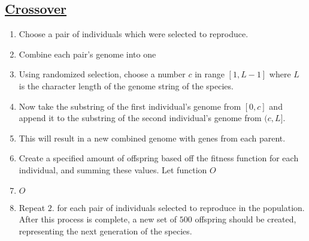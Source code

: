 \newpage
\subsection{\underline{Crossover}}
\begin{enumerate}
\item Choose a pair of individuals which were selected to reproduce. 
\item Combine each pair's genome into one
\bi
\item Using randomized selection, choose a number $c$ in range $[1,L-1]$ where $L$ is the character length of the genome string of the species.
\item Now take the substring of the first individual's genome from $[0, c]$ and append it to the substring of the second individual's genome from $(c, L]$. 
\item This will result in a new combined genome with genes from each parent.
\item Create a specified amount of offspring based off the fitness function for each individual, and summing these values. Let function $O$
\item $O$
\ei
\item Repeat $2.$ for each pair of individuals selected to reproduce in the population. After this process is complete, a new set of $500$ offspring should be created, representing the next generation of the species. 
\end{enumerate}